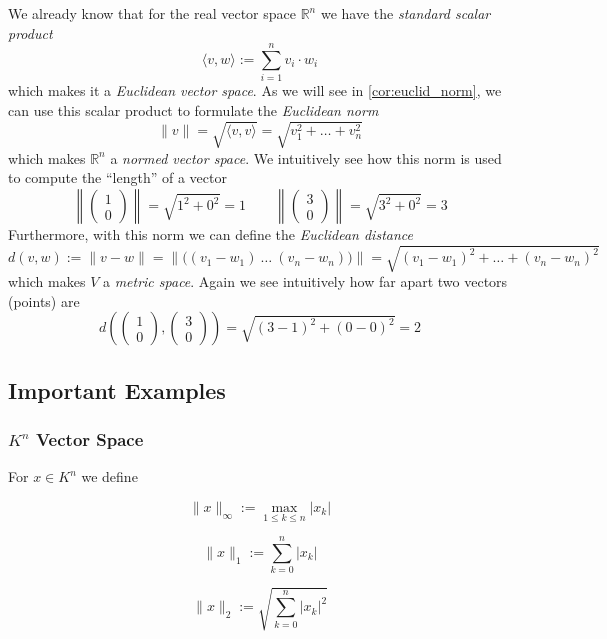We already know that for the real vector space \(\mathbb{R}^n\) we have the \emph{standard scalar product}
\[\langle v, w \rangle := \sum_{i = 1}^n v_i \cdot w_i\]
which makes it a \emph{Euclidean vector space}.
As we will see in \cref{cor:euclid_norm}, we can use this scalar product to formulate the \emph{Euclidean norm}
\[\|v\| = \sqrt{\langle v, v\rangle} = \sqrt{v_1^2 + \ldots + v_n^2}\]
which makes \(\mathbb{R}^n\) a \emph{normed vector space}.
We intuitively see how this norm is used to compute the ``length'' of a vector
\[\left\|\begin{pmatrix}1\\0\end{pmatrix}\right\| = \sqrt{1^2 + 0^2} = 1 \qquad \left\|\begin{pmatrix}3\\0\end{pmatrix}\right\| = \sqrt{3^2 + 0^2} = 3\]
Furthermore, with this norm we can define the \emph{Euclidean distance}
\[d(v, w) := \|v - w\| = \Big\|\big((v_1 - w_1)~\ldots~(v_n - w_n)\big)\Big\| = \sqrt{(v_1 - w_1)^2 + \ldots + (v_n - w_n)^2}\]
which makes \(V\) a \emph{metric space}.
Again we see intuitively how far apart two vectors (points) are
\[d\left(\begin{pmatrix}1\\0\end{pmatrix}, \begin{pmatrix}3\\0\end{pmatrix}\right) = \sqrt{(3 - 1)^2 + (0 - 0)^2} = 2\]

\subsection{Important Examples}
\subsubsection{\(K^n\) Vector Space}
For \(x \in K^n\) we define
\begin{definition}
   \[\|x\|_\infty := \max_{1 \leq k \leq n} |x_k|\]
\end{definition}

\begin{definition}[\(l^1\) Norm]
   \[\|x\|_1 := \sum_{k=0}^n |x_k|\]
\end{definition}

\begin{definition}[\(l^2\) Norm]
   \[\|x\|_2 := \sqrt{\sum_{k=0}^n |x_k|^2}\]
\end{definition}

